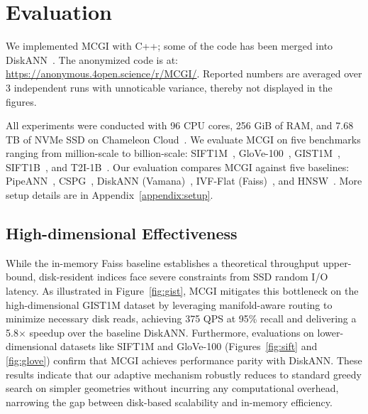 \documentclass{article}
\theoremstyle{plain}
\theoremstyle{definition}
\theoremstyle{remark}
\newcommand{\ours}{MCGI\xspace}
\begin{document}
\section{Evaluation}
\label{sec:experiments}

We implemented MCGI with C++; some of the code has been merged into DiskANN~\cite{subramanya2019diskann}. 
The anonymized code is at: \url{https://anonymous.4open.science/r/MCGI/}. Reported numbers are averaged over 3 independent runs with unnoticable variance, thereby not displayed in the figures.

All experiments were conducted with 96 CPU cores, 256 GiB of RAM, and 7.68 TB of NVMe SSD on Chameleon Cloud~\cite{keahey2020lessons}.
We evaluate MCGI on five benchmarks ranging from million-scale to billion-scale: SIFT1M~\cite{jegou2011product}, GloVe-100~\cite{pennington2014glove}, GIST1M~\cite{jegou2011product}, SIFT1B~\cite{jegou2011searching}, and T2I-1B~\cite{simhadri2025results}.
Our evaluation compares MCGI against five baselines: PipeANN~\cite{fast26odinann,osdi25pipeann}, CSPG~\cite{NEURIPS2024_bab1486c}, DiskANN (Vamana)~\cite{subramanya2019diskann}, IVF-Flat (Faiss)~\cite{johnson2019billion}, and HNSW~\cite{malkov2018efficient}.
More setup details are in Appendix~\ref{appendix:setup}.

\subsection{High-dimensional Effectiveness}
While the in-memory Faiss baseline establishes a theoretical throughput upper-bound, disk-resident indices face severe constraints from SSD random I/O latency. As illustrated in Figure~\ref{fig:gist}, \ours{} mitigates this bottleneck on the high-dimensional GIST1M dataset by leveraging manifold-aware routing to minimize necessary disk reads, achieving 375 QPS at 95\% recall and delivering a 5.8$\times$ speedup over the baseline DiskANN. 
Furthermore, evaluations on lower-dimensional datasets like SIFT1M and GloVe-100 (Figures~\ref{fig:sift} and \ref{fig:glove}) confirm that \ours{} achieves performance parity with DiskANN. These results indicate that our adaptive mechanism robustly reduces to standard greedy search on simpler geometries without incurring any computational overhead, narrowing the gap between disk-based scalability and in-memory efficiency.
\end{document}
